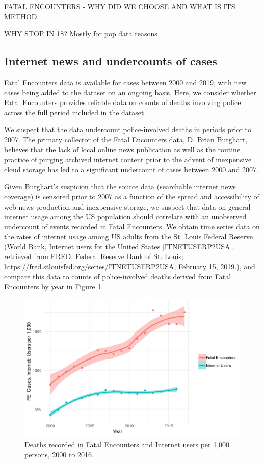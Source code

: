\documentclass{article}
\begin{document}
FATAL ENCOUNTERS - WHY DID WE CHOOSE AND WHAT IS ITS METHOD

WHY STOP IN 18? Mostly for pop data reasons

\subsection{Internet news and undercounts of cases}

Fatal Encounters data is available for cases between 2000 and 2019, with new cases being added to the dataset on an ongoing basis. Here, we consider whether Fatal Encounters provides reliable data on counts of deaths involving police across the full period included in the dataset. 

We suspect that the data undercount police-involved deaths in periods prior to 2007. The primary collector of the Fatal Encounters data, D. Brian Burghart, believes that the lack of local online news publication as well as the routine practice of purging archived internet content prior to the advent of inexpensive cloud storage has led to a significant undercount of cases between 2000 and 2007.

Given Burghart's suspicion that the source data (searchable internet news coverage) is censored prior to 2007 as a function of the spread and accessibility of web news production and inexpensive storage, we suspect that data on general internet usage among the US population should correlate with an unobserved undercount of events recorded in Fatal Encounters. We obtain time series data on the rates of internet usage among US adults from the St. Louis Federal Reserve (World Bank, Internet users for the United States [ITNETUSERP2USA], retrieved from FRED, Federal Reserve Bank of St. Louis; https://fred.stlouisfed.org/series/ITNETUSERP2USA, February 15, 2019.), and compare this data to counts of police-involved deaths derived from Fatal Encounters by year in Figure \ref{fig:internet}.

\begin{figure}
	\centering
	\includegraphics[width=\linewidth]{vis/internet_use_ts.pdf}
	\caption{Deaths recorded in Fatal Encounters and Internet users per 1,000 persons, 2000 to 2016.}
	\label{fig:internet}
\end{figure}
\end{document}
